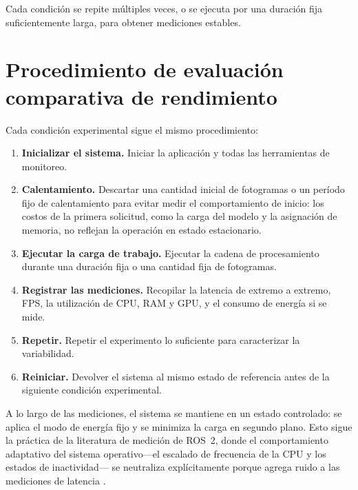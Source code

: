 Cada condición se repite múltiples veces, o se ejecuta por una duración fija
suficientemente larga, para obtener mediciones estables.

\section{Procedimiento de evaluación comparativa de rendimiento}
\label{sec:procedure}

Cada condición experimental sigue el mismo procedimiento:

\begin{enumerate}
  \item \textbf{Inicializar el sistema.} Iniciar la aplicación y todas las
        herramientas de monitoreo.
  \item \textbf{Calentamiento.} Descartar una cantidad inicial de
        fotogramas o un período fijo de calentamiento para evitar medir el
        comportamiento de inicio: los costos de la primera solicitud, como
        la carga del modelo y la asignación de memoria, no reflejan la
        operación en estado estacionario.
  \item \textbf{Ejecutar la carga de trabajo.} Ejecutar la cadena de
        procesamiento durante una duración fija o una cantidad fija de
        fotogramas.
  \item \textbf{Registrar las mediciones.} Recopilar la latencia de extremo
        a extremo, FPS, la utilización de CPU, RAM y GPU, y el consumo de
        energía si se mide.
  \item \textbf{Repetir.} Repetir el experimento lo suficiente para
        caracterizar la variabilidad.
  \item \textbf{Reiniciar.} Devolver el sistema al mismo estado de
        referencia antes de la siguiente condición experimental.
\end{enumerate}

A lo largo de las mediciones, el sistema se mantiene en un estado
controlado: se aplica el modo de energía fijo y se minimiza la carga en
segundo plano. Esto sigue la práctica de la literatura de medición de
ROS~2, donde el comportamiento adaptativo del sistema operativo---el
escalado de frecuencia de la CPU y los estados de inactividad--- se
neutraliza explícitamente porque agrega ruido a las mediciones de latencia
\cite{kronauer2021}.


